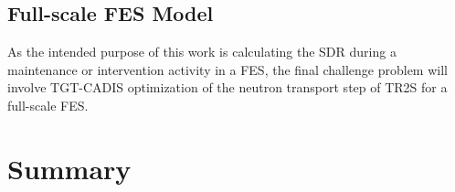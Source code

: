 

\subsection{Full-scale FES Model} \label{sec:full_scale}
As the intended purpose of this work is  
calculating the SDR during a maintenance or
intervention activity in a FES, the final challenge problem will involve 
TGT-CADIS optimization of the neutron transport step of TR2S for a full-scale
FES.

\section{Summary}\label{sec:summary}

